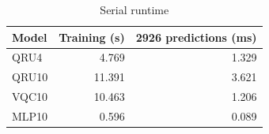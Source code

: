 \begin{table}[htbp]
\centering
\caption{Serial runtime}
\label{tab:runtime}
\small
\begin{tabular}{lrr}
\toprule
Model & Training (s) & 2926 predictions (ms) \\
\midrule
QRU4 & 4.769 & 1.329 \\
QRU10 & 11.391 & 3.621 \\
VQC10 & 10.463 & 1.206 \\
MLP10 & 0.596 & 0.089 \\
\bottomrule
\end{tabular}
\end{table}
